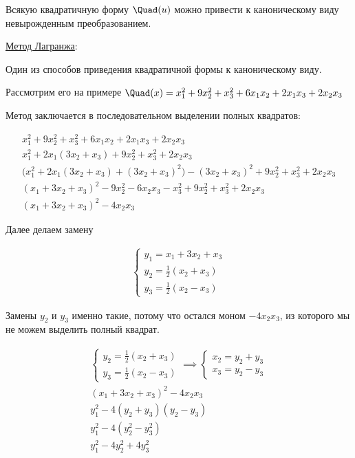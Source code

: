 \begin{theorem}
  Всякую квадратичную форму \(\Quad(u)\) можно привести к каноническому
  виду невырожденным преобразованием.
\end{theorem}

\underline{Метод Лагранжа}:

Один из способов приведения квадратичной формы к каноническому виду.

Рассмотрим его на примере \(
  \Quad(x)
  = x_{1}^2 + 9 x_{2}^2 + x_{3}^2
  + 6 x_{1} x_{2} + 2 x_{1} x_{3} + 2 x_{2} x_{3}
\)

Метод заключается в последовательном выделении полных квадратов:

\begin{align*}
  x_{1}^2 + 9 x_{2}^2 + x_{3}^2 +
  6 x_{1} x_{2} + 2 x_{1} x_{3} + 2 x_{2} x_{3}
  \\
  x_{1}^2 + 2 x_{1} (3 x_{2} + x_{3}) + 9 x_{2}^2 + x_{3}^2 + 2 x_{2} x_{3}
  \\
  \Big( x_{1}^2 + 2 x_{1} (3 x_{2} + x_{3}) + (3 x_{2} + x_{3})^2 \Big)
  - (3 x_{2} + x_{3})^2 + 9 x_{2}^2 + x_{3}^2 + 2 x_{2} x_{3}
  \\
  (x_{1} + 3 x_{2} + x_{3})^2
  - 9 x_{2}^2 - 6 x_{2} x_{3} - x_{3}^2
  + 9 x_{2}^2 + x_{3}^2 + 2 x_{2} x_{3} 
  \\
  (x_{1} + 3 x_{2} + x_{3})^2 - 4 x_{2} x_{3} 
\end{align*}

Далее делаем замену

\begin{align*}
  \begin{cases}
    y_{1} = x_{1} + 3 x_{2} + x_{3} \\
    y_{2} = \frac{1}{2} (x_{2} + x_{3}) \\
    y_{3} = \frac{1}{2} (x_{2} - x_{3})
  \end{cases}
\end{align*}

Замены \(y_{2}\) и \(y_{3}\) именно такие, потому что остался моном
\(- 4 x_{2} x_{3}\), из которого мы не можем выделить полный квадрат.

\begin{align*}
  \begin{cases}
    y_{2} = \frac{1}{2} (x_{2} + x_{3}) \\
    y_{3} = \frac{1}{2} (x_{2} - x_{3})
  \end{cases}
  \implies
  \begin{cases}
    x_{2} = y_{2} + y_{3} \\
    x_{3} = y_{2} - y_{3}  
  \end{cases} \\
  (x_{1} + 3 x_{2} + x_{3})^2 - 4 x_{2} x_{3}  \\
  y_{1}^2 - 4 (y_{2} + y_{3}) (y_{2} - y_{3}) \\
  y_{1}^2 - 4 (y_{2}^2 - y_{3}^2) \\
  y_{1}^2 - 4 y_{2}^2 + 4 y_{3}^2 \\
\end{align*}

